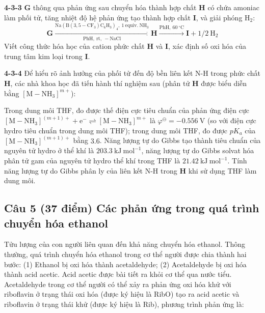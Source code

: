 \vspace{0.2cm}

\noindent
\textbf{4-3-3} $\mathbf{G}$ thông qua phản ứng sau chuyển hóa thành hợp chất $\mathbf{H}$ có chứa amoniac làm phối tử, tăng nhiệt độ hệ phản ứng tạo thành hợp chất $\mathbf{I}$, và giải phóng $\mathrm{H_2}$:
\[ 
\mathbf{G} \xrightarrow[\mathrm{PhH,\ rt,\ -NaCl}]{\mathrm{Na(B(3,5-CF_3)C_6H_3)_4,\ 1\ equiv.\ NH_3}} \mathbf{H} \xrightarrow{\mathrm{PhH,\ 60\ ^\circ C}} \mathbf{I} + 1/2\ \mathrm{H_2} 
\]
Viết công thức hóa học của cation phức chất $\mathbf{H}$ và $\mathbf{I}$, xác định số oxi hóa của trung tâm kim loại trong $\mathbf{I}$.

\vspace{0.2cm}

\noindent
\textbf{4-3-4} Để hiểu rõ ảnh hưởng của phối tử đến độ bền liên kết N-H trong phức chất $\mathbf{H}$, các nhà khoa học đã tiến hành thí nghiệm sau (phân tử $\mathbf{H}$ được biểu diễn bằng $[\mathrm{M-NH_3}]^{m+}$):

Trong dung môi THF, đo được thế điện cực tiêu chuẩn của phản ứng điện cực $[\mathrm{M-NH_3}]^{(m+1)+} + \mathrm{e^-} \rightleftharpoons [\mathrm{M-NH_3}]^{m+}$ là $\varphi^\ominus = -0.556\ \mathrm{V}$ (so với điện cực hydro tiêu chuẩn trong dung môi THF); trong dung môi THF, đo được $pK_a$ của $[\mathrm{M-NH_3}]^{(m+1)+}$ bằng $3.6$. Năng lượng tự do Gibbs tạo thành tiêu chuẩn của nguyên tử hydro ở thể khí là $203.3\ \mathrm{kJ\ mol^{-1}}$, năng lượng tự do Gibbs solvat hóa phân tử gam của nguyên tử hydro thể khí trong THF là $21.42\ \mathrm{kJ\ mol^{-1}}$. Tính năng lượng tự do Gibbs phân ly của liên kết N-H trong $\mathbf{H}$ khi sử dụng THF làm dung môi.

\vspace{0.5cm}

\subsection{Câu 5 (37 điểm) Các phản ứng trong quá trình chuyển hóa ethanol}

Tửu lượng của con người liên quan đến khả năng chuyển hóa ethanol. Thông thường, quá trình chuyển hóa ethanol trong cơ thể người được chia thành hai bước: (1) Ethanol bị oxi hóa thành acetaldehyde; (2) Acetaldehyde bị oxi hóa thành acid acetic. Acid acetic được bài tiết ra khỏi cơ thể qua nước tiểu. Acetaldehyde trong cơ thể người có thể xảy ra phản ứng oxi hóa khử với riboflavin ở trạng thái oxi hóa (được ký hiệu là RibO) tạo ra acid acetic và riboflavin ở trạng thái khử (được ký hiệu là Rib), phương trình phản ứng là:

